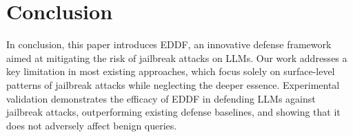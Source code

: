 \section{Conclusion}
In conclusion, this paper introduces EDDF, an innovative defense framework aimed at mitigating the risk of jailbreak attacks on LLMs. Our work addresses a key limitation in most existing approaches, which focus solely on surface-level patterns of jailbreak attacks while neglecting the deeper essence. Experimental validation demonstrates the efficacy of EDDF in defending LLMs against jailbreak attacks, outperforming existing defense baselines, and showing that it does not adversely affect benign queries.